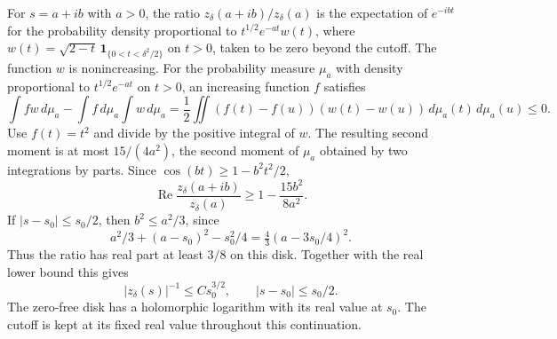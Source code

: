 \documentclass[11pt,letterpaper,reqno]{amsart}
\numberwithin{equation}{section}
\theoremstyle{definition}
\theoremstyle{remark}
\begin{document}
For \(s=a+ib\) with \(a>0\), the ratio
\(z_\delta(a+ib)/z_\delta(a)\) is the expectation of \(e^{-ibt}\)
for the probability density proportional to
\(t^{1/2}e^{-at}w(t)\), where
\(w(t)=\sqrt{2-t}\,\mathbf1_{\{0<t<\delta^2/2\}}\)
on \(t>0\), taken to be zero beyond the cutoff.
The function \(w\) is nonincreasing. For the probability
measure \(\mu_a\) with density proportional to \(t^{1/2}e^{-at}\)
on \(t>0\), an increasing function \(f\) satisfies
\[
 \int fw\,d\mu_a-\int f\,d\mu_a\int w\,d\mu_a
  =\frac12\iint(f(t)-f(u))(w(t)-w(u))
                         \,d\mu_a(t)\,d\mu_a(u)\leq0 .
\]
Use \(f(t)=t^2\) and divide by the positive integral of \(w\).
The resulting second moment is at most \(15/(4a^2)\), the
second moment of \(\mu_a\) obtained by two integrations by parts.
Since \(\cos(bt)\geq1-b^2t^2/2\),
\[
 \operatorname{Re}\frac{z_\delta(a+ib)}{z_\delta(a)}
                 \geq 1-\frac{15b^2}{8a^2}.
\]
If \(|s-s_0|\leq s_0/2\), then \(b^2\leq a^2/3\), since
\[
 a^2/3+(a-s_0)^2-s_0^2/4
       =\tfrac43(a-3s_0/4)^2 .
\]
Thus the ratio has real part at least \(3/8\) on this disk.
Together with the real lower bound this gives
\begin{equation}\label{eq:soft-z-complex}
 |z_\delta(s)|^{-1}\leq C s_0^{3/2},
           \qquad |s-s_0|\leq s_0/2 .
\end{equation}
The zero-free disk has a holomorphic logarithm with its real
value at \(s_0\). The cutoff is kept at its fixed real value
throughout this continuation.
\end{document}
